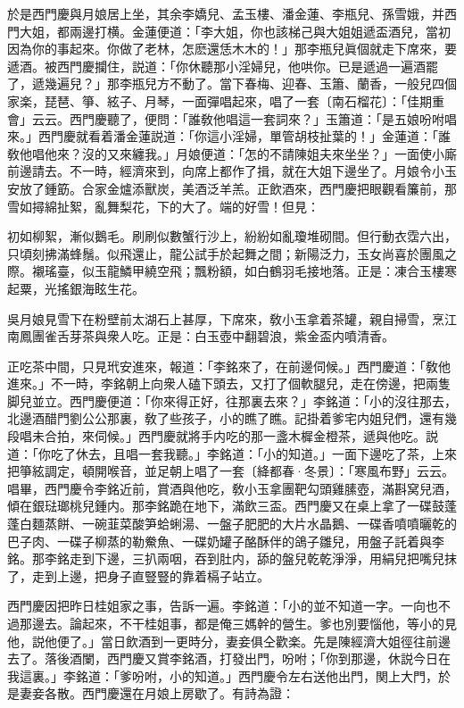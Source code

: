 於是西門慶與月娘居上坐，其余李嬌兒、孟玉樓、潘金蓮、李瓶兒、孫雪娥，并西門大姐，都兩邊打横。金蓮便道：「李大姐，你也該梯己與大姐姐遞盃酒兒，當初因為你的事起來。你做了老林，怎麽還恁木木的！」那李瓶兒眞個就走下席來，要遞酒。被西門慶攔住，説道：「你休聽那小淫婦兒，他哄你。已是遞過一遍酒罷了，遞幾遍兒？」那李瓶兒方不動了。當下春梅、迎春、玉簫、蘭香，一般兒四個家楽，琵琶、箏、絃子、月琴，一面彈唱起來，唱了一套〔南石榴花〕：「佳期重會」云云。西門慶聽了，便問：「誰敎他唱這一套詞來？」玉簫道：「是五娘吩咐唱來。」西門慶就看着潘金蓮説道：「你這小淫婦，單管胡枝扯葉的！」金蓮道：「誰敎他唱他來？沒的又來纏我。」月娘便道：「怎的不請陳姐夫來坐坐？」一面使小廝前邊請去。不一時，經濟來到，向席上都作了揖，就在大姐下邊坐了。月娘令小玉安放了鍾筯。合家金爐添獸炭，美酒泛羊羔。正飲酒來，西門慶把眼觀看簾前，那雪如撏綿扯絮，亂舞梨花，下的大了。端的好雪！但見：

\begin{myquote}
初如柳絮，漸似鵝毛。刷刷似數蟹行沙上，紛紛如亂瓊堆砌間。但行動衣霑六出，只頃刻拂滿蜂鬚。似飛還止，龍公試手於起舞之間；新陽泛力，玉女尚喜於團風之際。襯瑤臺，似玉龍鱗甲繞空飛；飄粉額，如白鶴羽毛接地落。正是：凍合玉樓寒起粟，光搖銀海眩生花。
\end{myquote}

吳月娘見雪下在粉壁前太湖石上甚厚，下席來，敎小玉拿着茶罐，親自掃雪，烹江南鳳團雀舌芽茶與衆人吃。正是：白玉壺中翻碧浪，紫金盃内噴清香。

正吃茶中間，只見玳安進來，報道：「李銘來了，在前邊伺候。」西門慶道：「敎他進來。」不一時，李銘朝上向衆人磕下頭去，又打了個軟腿兒，走在傍邊，把兩隻脚兒並立。西門慶便道：「你來得正好，往那裏去來？」李銘道：「小的沒往那去，北邊酒醋門劉公公那裏，敎了些孩子，小的瞧了瞧。記掛着爹宅内姐兒們，還有幾段唱未合拍，來伺候。」西門慶就將手内吃的那一盞木樨金橙茶，遞與他吃。説道：「你吃了休去，且唱一套我聽。」李銘道：「小的知道。」一面下邊吃了茶，上來把箏絃調定，頓開喉音，並足朝上唱了一套〔絳都春·冬景〕：「寒風布野」云云。　唱畢，西門慶令李銘近前，賞酒與他吃，敎小玉拿團靶勾頭雞膆壺，滿斟窝兒酒，傾在銀琺瑯桃兒鍾内。那李銘跪在地下，滿飲三盃。西門慶又在桌上拿了一碟鼓蓬蓬白麵蒸餅、一碗韮菜酸笋蛤蜊湯、一盤子肥肥的大片水晶鵝、一碟香噴噴曬乾的巴子肉、一碟子柳蒸的勒鮝魚、一碟奶罐子酪酥伴的鴿子雛兒，用盤子託着與李銘。那李銘走到下邊，三扒兩咽，吞到肚内，舔的盤兒乾乾淨淨，用絹兒把嘴兒抹了，走到上邊，把身子直豎豎的靠着槅子站立。

西門慶因把昨日桂姐家之事，告訴一遍。李銘道：「小的並不知道一字。一向也不過那邊去。論起來，不干桂姐事，都是俺三媽幹的營生。爹也別要惱他，等小的見他，説他便了。」當日飲酒到一更時分，妻妾俱仝歡楽。先是陳經濟大姐徑往前邊去了。落後酒闌，西門慶又賞李銘酒，打發出門，吩咐；「你到那邊，休説今日在我這裏。」李銘道：「爹吩咐，小的知道。」西門慶令左右送他出門，関上大門，於是妻妾各散。西門慶還在月娘上房歇了。有詩為證：

